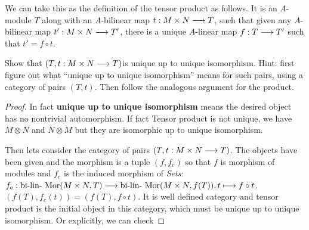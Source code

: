 \documentclass[11pt,fleqn]{book} %
\begin{document}
\begin{exr}
We can take this as the definition of the tensor product as follows. It is an $A$-module $T$ along with an $A$-bilinear map $t: M \times N \longrightarrow T$, such that given any $A$-bilinear map $t':M\times N\longrightarrow T'$, there is a unique $A$-linear map $f:T \longrightarrow T'$ such that $t' =f\circ t$.

\begin{center}
\end{center}
  
Show that $(T,t:M\times N\longrightarrow T)$is unique up to unique isomorphism. Hint: first figure out what “unique up to unique isomorphism” means for such pairs, using a category of pairs $(T, t)$. Then follow the analogous argument for the product.
\end{exr}
\begin{proof}
In fact \textbf{unique up to unique isomorphism} means the desired object has no nontrivial automorphism. If fact Tensor product is not unique, we have $M\otimes N$ and $N\otimes M$ but they are isomorphic up to unique isomorphism.

Then lets consider the category of pairs $(T,t: M\times N\longrightarrow T)$. The objects have been given and the morphism is a tuple $(f, f_{e})$ so that $f$ is  morphism of modules and $f_{e}$ is the induced morphism of \textit{Sets}: $f_e:\text{bi-lin-}\text{ Mor}(M\times N, T)\longrightarrow \text{bi-lin-}\text{ Mor}(M\times N, f(T)), t\longmapsto f\circ t$. $(f(T), f_{e}(t))=(f(T), f\circ t)$. It is well defined category and tensor product is the initial object in this category, which must be unique up to unique isomorphism. Or explicitly, we can check
\end{proof}
\end{document}
